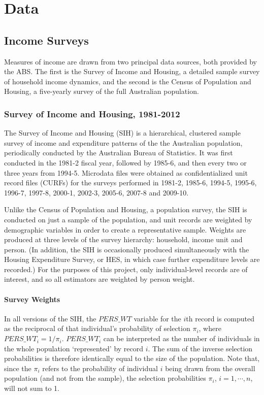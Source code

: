 \chapter{Data}
\label{app:data}

\section{Income Surveys}

Measures of income are drawn from two principal data sources, both provided by the ABS. The first is the Survey of Income and Housing, a detailed sample survey of household income dynamics, and the second is the Census of Population and Housing, a five-yearly survey of the full Australian population. 

\subsection{Survey of Income and Housing, 1981-2012}
\label{sec:SIH}

The Survey of Income and Housing (SIH) is a hierarchical, clustered sample survey of income and expenditure patterns of the the Australian population, periodically conducted by the Australian Bureau of Statistics. It was first conducted in the 1981-2 fiscal year, followed by 1985-6, and then every two or three years from 1994-5. Microdata files were obtained as confidentialized unit record files (CURFs) for the surveys performed in 1981-2, 1985-6, 1994-5, 1995-6, 1996-7, 1997-8, 2000-1, 2002-3, 2005-6, 2007-8 and 2009-10.

Unlike the Census of Population and Housing, a population survey, the SIH is conducted on just a sample of the population, and unit records are weighted by demographic variables in order to create a representative sample. Weights are produced at three levels of the survey hierarchy: household, income unit and person. (In addition, the SIH is occasionally produced simultaneously with the Housing Expenditure Survey, or HES, in which case further expenditure levels are recorded.) For the purposes of this project, only individual-level records are of interest, and so all estimators are weighted by person weight.

\subsubsection{Survey Weights}

In all versions of the SIH, the $PERS\_WT$ variable for the $i$th record is computed as the reciprocal of that individual's probability of selection $\pi_i$, where $PERS\_WT_i = 1/\pi_i.$ $PERS\_WT_i$ can be interpreted as the number of individuals in the whole population `represented' by record $i$. The sum of the inverse selection probabilities is therefore identically equal to the size of the population. Note that, since the $\pi_i$ refers to the probability of individual $i$ being drawn from the overall population (and not from the sample), the selection probabilities $\pi_i$, $i=1,\cdots,n$, will not sum to 1.



